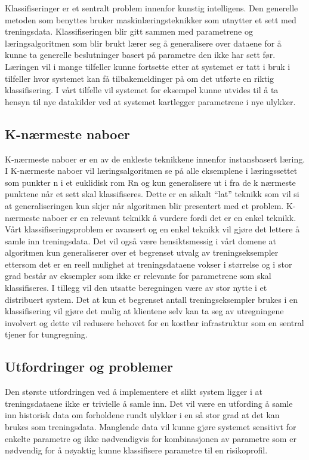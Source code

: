 \documentclass[a4paper,norsk,oneside]{book}
\begin{document}
Klassifiseringer er et sentralt problem innenfor kunstig intelligens. Den generelle metoden som benyttes bruker maskinlæringsteknikker som utnytter et sett med treningsdata. Klassifiseringen blir gitt sammen med parametrene og læringsalgoritmen som blir brukt lærer seg å generalisere over dataene for å kunne ta generelle beslutninger basert på parametre den ikke har sett før. Læringen vil i mange tilfeller kunne fortsette etter at systemet er tatt i bruk i tilfeller hvor systemet kan få tilbakemeldinger på om det utførte en riktig klassifisering. I vårt tilfelle vil systemet for eksempel kunne utvides til å ta hensyn til nye datakilder ved at systemet kartlegger parametrene i nye ulykker.	

\subsection{K-nærmeste naboer}
K-nærmeste naboer er en av de enkleste teknikkene innenfor instansbasert læring. I K-nærmeste naboer vil læringsalgoritmen se på alle eksemplene i læringssettet som punkter n i et euklidisk rom Rn og kun generalisere ut i fra de k nærmeste punktene når et sett skal klassifiseres.\cite{mitchell} Dette er en såkalt “lat” teknikk som vil si at generaliseringen kun skjer når algoritmen blir presentert med et problem. K-nærmeste naboer er en relevant teknikk å vurdere fordi det er en enkel teknikk. Vårt klassifiseringsproblem er avansert og en enkel teknikk vil gjøre det lettere å samle inn treningsdata. Det vil også være hensiktsmessig i vårt domene at algoritmen kun generaliserer over et begrenset utvalg av treningseksempler ettersom det er en reell mulighet at treningsdataene vokser i størrelse og i stor grad består av eksempler som ikke er relevante for parametrene som skal klassifiseres. I tillegg vil den utsatte beregningen være av stor nytte i et distribuert system. Det at kun et begrenset antall treningseksempler brukes i en klassifisering vil gjøre det mulig at klientene selv kan ta seg av utregningene involvert og dette vil redusere behovet for en kostbar infrastruktur som en sentral tjener for tungregning.

\subsection{Utfordringer og problemer}
Den største utfordringen ved å implementere et slikt system ligger i at treningsdataene ikke er trivielle å samle inn. Det vil være en utfording å samle inn historisk data om forholdene rundt ulykker i en så stor grad at det kan brukes som treningsdata. Manglende data vil kunne gjøre systemet sensitivt for enkelte parametre og ikke nødvendigvis for kombinasjonen av parametre som er nødvendig for å nøyaktig kunne klassifisere parametre til en risikoprofil.  
\end{document}
